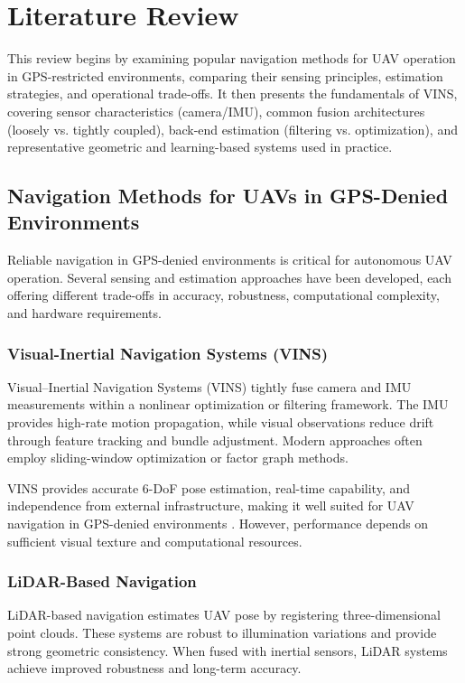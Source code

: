 \section{Literature Review}
\sloppy

This review begins by examining popular navigation methods for UAV operation in GPS-restricted environments, comparing their sensing principles, estimation strategies, and operational trade-offs. It then presents the fundamentals of VINS, covering sensor characteristics (camera/IMU), common fusion architectures (loosely vs. tightly coupled), back-end estimation (filtering vs. optimization), and representative geometric and learning-based systems used in practice.

\subsection{Navigation Methods for UAVs in GPS-Denied Environments}

Reliable navigation in GPS-denied environments is critical for autonomous UAV operation. Several sensing and estimation approaches have been developed, each offering different trade-offs in accuracy, robustness, computational complexity, and hardware requirements.

\subsubsection{Visual-Inertial Navigation Systems (VINS)}

Visual--Inertial Navigation Systems (VINS) tightly fuse camera and IMU measurements within a nonlinear optimization or filtering framework. The IMU provides high-rate motion propagation, while visual observations reduce drift through feature tracking and bundle adjustment. Modern approaches often employ sliding-window optimization or factor graph methods.

VINS provides accurate 6-DoF pose estimation, real-time capability, and independence from external infrastructure, making it well suited for UAV navigation in GPS-denied environments \cite{qin2018vins, forster2017manifold, cadena2016slam}. However, performance depends on sufficient visual texture and computational resources.

\subsubsection{LiDAR-Based Navigation}

LiDAR-based navigation estimates UAV pose by registering three-dimensional point clouds. These systems are robust to illumination variations and provide strong geometric consistency. When fused with inertial sensors, LiDAR systems achieve improved robustness and long-term accuracy.

